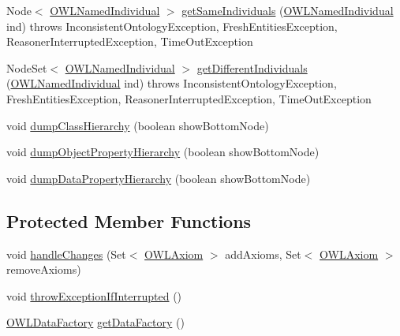 \begin{DoxyCompactItemize}
\item 
Node$<$ \hyperlink{interfaceorg_1_1semanticweb_1_1owlapi_1_1model_1_1_o_w_l_named_individual}{O\-W\-L\-Named\-Individual} $>$ \hyperlink{classorg_1_1semanticweb_1_1owlapi_1_1reasoner_1_1structural_1_1_structural_reasoner_a8c8c022c4b0ce3c6e1e90abaf0cdbb3e}{get\-Same\-Individuals} (\hyperlink{interfaceorg_1_1semanticweb_1_1owlapi_1_1model_1_1_o_w_l_named_individual}{O\-W\-L\-Named\-Individual} ind)  throws Inconsistent\-Ontology\-Exception, Fresh\-Entities\-Exception, Reasoner\-Interrupted\-Exception, Time\-Out\-Exception 
\item 
Node\-Set$<$ \hyperlink{interfaceorg_1_1semanticweb_1_1owlapi_1_1model_1_1_o_w_l_named_individual}{O\-W\-L\-Named\-Individual} $>$ \hyperlink{classorg_1_1semanticweb_1_1owlapi_1_1reasoner_1_1structural_1_1_structural_reasoner_a3428eb34655d10c9004fd47b3f4cf407}{get\-Different\-Individuals} (\hyperlink{interfaceorg_1_1semanticweb_1_1owlapi_1_1model_1_1_o_w_l_named_individual}{O\-W\-L\-Named\-Individual} ind)  throws Inconsistent\-Ontology\-Exception, Fresh\-Entities\-Exception, Reasoner\-Interrupted\-Exception, Time\-Out\-Exception 
\item 
void \hyperlink{classorg_1_1semanticweb_1_1owlapi_1_1reasoner_1_1structural_1_1_structural_reasoner_ab78477f5d63bb92b338676dea19dccba}{dump\-Class\-Hierarchy} (boolean show\-Bottom\-Node)
\item 
void \hyperlink{classorg_1_1semanticweb_1_1owlapi_1_1reasoner_1_1structural_1_1_structural_reasoner_ab44327c611b127161270555d01de3e7b}{dump\-Object\-Property\-Hierarchy} (boolean show\-Bottom\-Node)
\item 
void \hyperlink{classorg_1_1semanticweb_1_1owlapi_1_1reasoner_1_1structural_1_1_structural_reasoner_ad19589354d436fec544c619c2e651b3c}{dump\-Data\-Property\-Hierarchy} (boolean show\-Bottom\-Node)
\end{DoxyCompactItemize}
\subsection*{Protected Member Functions}
\begin{DoxyCompactItemize}
\item 
void \hyperlink{classorg_1_1semanticweb_1_1owlapi_1_1reasoner_1_1structural_1_1_structural_reasoner_a442bb538847cd94c0ddc405304a36595}{handle\-Changes} (Set$<$ \hyperlink{interfaceorg_1_1semanticweb_1_1owlapi_1_1model_1_1_o_w_l_axiom}{O\-W\-L\-Axiom} $>$ add\-Axioms, Set$<$ \hyperlink{interfaceorg_1_1semanticweb_1_1owlapi_1_1model_1_1_o_w_l_axiom}{O\-W\-L\-Axiom} $>$ remove\-Axioms)
\item 
void \hyperlink{classorg_1_1semanticweb_1_1owlapi_1_1reasoner_1_1structural_1_1_structural_reasoner_a3df717367daf9f36dac3c5b3425db511}{throw\-Exception\-If\-Interrupted} ()
\item 
\hyperlink{interfaceorg_1_1semanticweb_1_1owlapi_1_1model_1_1_o_w_l_data_factory}{O\-W\-L\-Data\-Factory} \hyperlink{classorg_1_1semanticweb_1_1owlapi_1_1reasoner_1_1structural_1_1_structural_reasoner_a365746a675f83953960af96c29757c18}{get\-Data\-Factory} ()
\end{DoxyCompactItemize}
